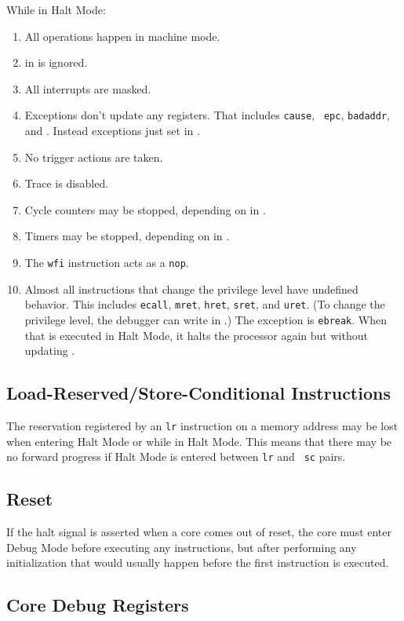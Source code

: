 \documentclass{article}
\newenvironment{steps}[1]
{
   \vspace{1ex}
   \noindent
   #1
   \begin{enumerate}[nosep]
}
{
   \end{enumerate}
   \vspace{1ex}
}
\begin{document}
\begin{steps}{While in Halt Mode:}
\item All operations happen in machine mode.
\item \Fmprv in \Rmstatus is ignored.
\item All interrupts are masked.
\item Exceptions don't update any registers.  That includes {\tt cause}, {\tt
    epc}, {\tt badaddr}, and \Rmstatus.  Instead exceptions just set \Fhmexc in
    \Rdcsr.
\item No trigger actions are taken.
\item Trace is disabled.
\item Cycle counters may be stopped, depending on \Fstopcycle in \Rdcsr.
\item Timers may be stopped, depending on \Fstoptime in \Rdcsr.
\item The {\tt wfi} instruction acts as a {\tt nop}.
\item Almost all instructions that change the privilege level have undefined
    behavior.  This includes {\tt ecall}, {\tt mret}, {\tt hret}, {\tt sret},
    and {\tt uret}.  (To change the privilege level, the debugger can write
    \Fprv in \Rdcsr.) The exception is {\tt ebreak}. When that is executed in
    Halt Mode, it halts the processor again but without updating \Rdpc.
\end{steps}

\subsection{Load-Reserved/Store-Conditional Instructions}

The reservation registered by an {\tt lr} instruction on a memory address may
be lost when entering Halt Mode or while in Halt Mode.  This means that there
may be no forward progress if Halt Mode is entered between {\tt lr} and {\tt
sc} pairs.

\subsection{Reset}

If the halt signal is asserted when a core comes out of reset, the core must
enter Debug Mode before executing any instructions, but after performing any
initialization that would usually happen before the first instruction is
executed.

\subsection{Core Debug Registers} \label{debreg}
\end{document}

